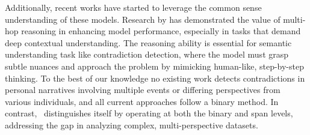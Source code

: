 Additionally, recent works have started to leverage the common sense understanding of these models\cite{paranjape-etal-2021-prompting}. Research by \cite{fei2023reasoning,jiang-etal-2022-understanding} has demonstrated the value of multi-hop reasoning in enhancing model performance, especially in tasks that demand deep contextual understanding. The reasoning ability is essential for semantic understanding task like contradiction detection, where the model must grasp subtle nuances and approach the problem by mimicking human-like, step-by-step thinking. To the best of our knowledge no existing work detects contradictions in personal narratives involving multiple events or differing perspectives from various individuals, and all current approaches follow a binary method. In contrast, \model\ distinguishes itself by operating at both the binary and span levels, addressing the gap in analyzing complex, multi-perspective datasets.